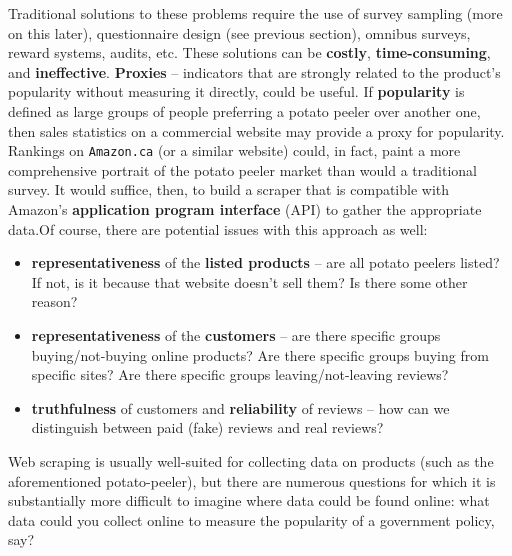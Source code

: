 Traditional solutions to these problems require the use of survey sampling (more on this later), questionnaire design (see previous section), omnibus surveys, reward systems, audits, etc. These solutions can be \textbf{costly}, \textbf{time-consuming}, and \textbf{ineffective}. \newl \textbf{Proxies} -- indicators that are strongly related to the product's popularity without measuring it directly, could be useful. If \textbf{popularity} is defined as large groups of people preferring a potato peeler over another one, then sales statistics on a commercial website may provide a proxy for popularity. 
\newl Rankings on \texttt{Amazon.ca} (or a similar website) could, in fact, paint a more comprehensive portrait of the potato peeler market than would a traditional survey. It would suffice, then, to build a scraper that is compatible with Amazon's \textbf{application program interface} (API) to gather the appropriate data.\newl Of course, there are potential issues with this approach as well: 
\begin{itemize}[noitemsep]
\item \textbf{representativeness} of the \textbf{listed products} -- are all potato peelers listed? If not, is it because that website doesn't sell them? Is there some other reason?
\item \textbf{representativeness} of the \textbf{customers} -- are there specific groups buying/not-buying online products? Are there specific groups buying from specific sites? Are there specific groups leaving/not-leaving reviews? 
\item \textbf{truthfulness} of customers and \textbf{reliability} of reviews -- how can we distinguish between paid (fake) reviews and real reviews?
\end{itemize}
Web scraping is usually well-suited for collecting data on products (such as the aforementioned potato-peeler), but there are numerous questions for which it is substantially more difficult to imagine where data could be found online: what data could you collect online to measure the popularity of a government policy, say? 

